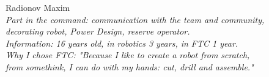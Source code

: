 \begin{figure}[H]
\begin{minipage}[h]{0.47\linewidth}
	\end{minipage}
	\vfill 
	\begin{minipage}[h]{0.47\linewidth}
		Radionov Maxim\\
		\emph{Part in the command: communication with the team and community, decorating robot, Power Design, reserve operator. \\  }
		\emph{Information: 16 years old, in robotics 3 years, in FTC 1 year. \\}
		\emph{Why I chose FTC: "Because I like to create a robot from scratch, from somethink, I can do with my hands: cut, drill and assemble."}					
	\end{minipage}
	\hfill
	\begin{minipage}[h]{0.47\linewidth}
		\\
	\end{minipage}

\end{figure}
